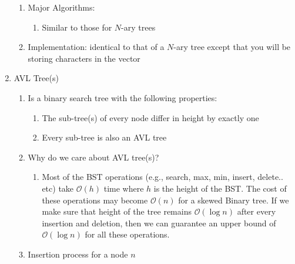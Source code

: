 \documentclass [12pt, executivepaper]{article}
\begin{document}
\begin{enumerate}
\begin{enumerate}
\item Major Algorithms:

\begin{enumerate}

\item Similar to those for $N$-ary trees

\end{enumerate}

\item Implementation: identical to that of a $N$-ary tree except that you will be storing characters in the vector

\end{enumerate}


\item AVL Tree(s)

\begin{enumerate}

\item Is a binary search tree with the following properties:

\begin{enumerate}

\item The sub-tree(s) of every node differ in height by exactly one

\item Every sub-tree is also an AVL tree

\end{enumerate}

\item Why do we care about AVL tree(s)?

\begin{enumerate}

\item Most of the BST operations (e.g., search, max, min, insert, delete.. etc) take $\mathcal{O}(h)$ time where $h$ is the height of the BST. The cost of these operations may become $\mathcal{O}(n)$ for a skewed Binary tree. 
If we make sure that height of the tree remains $\mathcal{O}(\log{} n)$ after every insertion and deletion, then we can guarantee an upper bound of $\mathcal{O}(\log{} n)$ for all these operations. 

\end{enumerate}

\item Insertion process for a node $n$

\begin{enumerate}


\end{enumerate}
\end{enumerate}
\end{enumerate}
\end{document}

